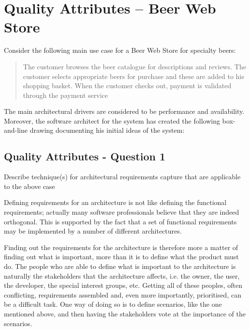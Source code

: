 \section{Quality Attributes -- Beer Web Store}

Consider the following main use case for a Beer Web Store for specialty
beers:

\begin{quote}
  The customer browses the beer catalogue for descriptions and
  reviews. The customer selects appropriate beers for purchase and
  these are added to his shopping basket. When the customer checks
  out, payment is validated through the payment service
\end{quote}
The main architectural drivers are considered to be performance and
availability. Moreover, the software architect for the system has
created the following box-and-line drawing documenting his initial
ideas of the system:
\begin{figure}[h!]
  \centerline{}
\end{figure}

\subsection{Quality Attributes - Question 1}

\begin{question}
Describe technique(s) for architectural requirements capture
that are applicable to the above case
\end{question}

Defining requirements for an architecture is not like defining the functional requirements; actually many software professionals believe that they are indeed orthogonal. This is supported by the fact that a set of functional requirements may be implemented by a number of different architectures.

Finding out the requirements for the architecture is therefore more a matter of finding out what is important, more than it is to define what the product must do. The people who are able to define what is important to the architecture is naturally the stakeholders that the architecture affects, i.e. the owner, the user, the developer, the special interest groups, etc. Getting all of these peoples, often conflicting, requirements assembled and, even more importantly, prioritised, can be a difficult task. One way of doing so is to define scenarios, like the one mentioned above, and then having the stakeholders vote at the importance of the scenarios. 

